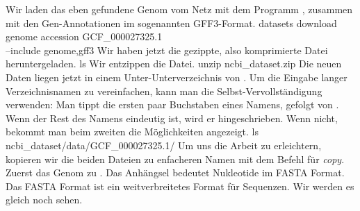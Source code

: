 Wir laden das eben gefundene Genom vom Netz mit dem Programm
, zusammen mit den Gen-Annotationen im sogenannten
GFF3-Format.
\nwenddocs{}\plusendmoddef\nwstartdeflinemarkup{}\nwenddeflinemarkup
datasets download genome accession GCF_000027325.1 \\
         --include genome,gff3
\nwendcode{}\nwdocspar
Wir haben jetzt die gezippte, also komprimierte Datei
 heruntergeladen.
\nwenddocs{}\plusendmoddef\nwstartdeflinemarkup{}\nwenddeflinemarkup
ls
\nwendcode{}\nwdocspar
Wir entzippen die Datei.
\nwenddocs{}\plusendmoddef\nwstartdeflinemarkup{}\nwenddeflinemarkup
unzip ncbi_dataset.zip
\nwendcode{}\nwdocspar
Die neuen Daten liegen jetzt in einem Unter-Unterverzeichnis von
. Um die Eingabe langer Verzeichnisnamen zu
vereinfachen, kann man die Selbst-Vervollständigung verwenden: Man
tippt die ersten paar Buchstaben eines Namens, gefolgt von
. Wenn der Rest des Namens eindeutig ist, wird er
hingeschrieben. Wenn nicht, bekommt man beim zweiten  die
Möglichkeiten angezeigt.
\nwenddocs{}\plusendmoddef\nwstartdeflinemarkup{}\nwenddeflinemarkup
ls ncbi_dataset/data/GCF_000027325.1/
\nwendcode{}\nwdocspar
Um uns die Arbeit zu erleichtern, kopieren wir die beiden Dateien zu
enfacheren Namen mit dem Befehl  für \emph{copy}. Zuerst das
Genom zu . Das Anhängsel  bedeutet Nukleotide im
FASTA Format. Das FASTA Format ist ein weitverbreitetes Format für
Sequenzen. Wir werden es gleich noch sehen.  \tiny
\nwenddocs{}\plusendmoddef\nwstartdeflinemarkup{}\nwenddeflinemarkup
